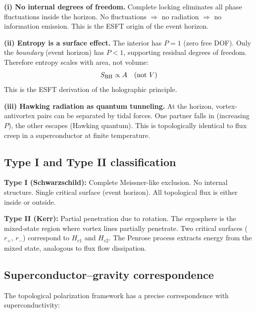 ﻿\documentclass[twocolumn,preprintnumbers,amsmath,amssymb,prd]{revtex4-2}
\begin{document}
\textbf{(i) No internal degrees of freedom.} Complete locking eliminates all phase fluctuations inside the horizon. No fluctuations $\Rightarrow$ no radiation $\Rightarrow$ no information emission. This is the ESFT origin of the event horizon.

\textbf{(ii) Entropy is a surface effect.} The interior has $P = 1$ (zero free DOF). Only the \emph{boundary} (event horizon) has $P < 1$, supporting residual degrees of freedom. Therefore entropy scales with area, not volume:
\begin{equation}
S_{\rm BH} \propto A \quad (\text{not } V)
\end{equation}
This is the ESFT derivation of the holographic principle.

\textbf{(iii) Hawking radiation as quantum tunneling.} At the horizon, vortex-antivortex pairs can be separated by tidal forces. One partner falls in (increasing $P$), the other escapes (Hawking quantum). This is topologically identical to flux creep in a superconductor at finite temperature.

\subsection{Type I and Type II classification}

\textbf{Type I (Schwarzschild):} Complete Meissner-like exclusion. No internal structure. Single critical surface (event horizon). All topological flux is either inside or outside.

\textbf{Type II (Kerr):} Partial penetration due to rotation. The ergosphere is the mixed-state region where vortex lines partially penetrate. Two critical surfaces ($r_+$, $r_-$) correspond to $H_{c1}$ and $H_{c2}$. The Penrose process extracts energy from the mixed state, analogous to flux flow dissipation.

\subsection{Superconductor--gravity correspondence}

The topological polarization framework has a precise correspondence with superconductivity:
\end{document}

